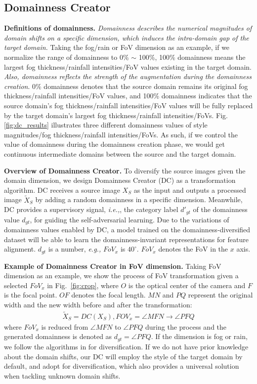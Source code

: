 \documentclass[10pt,journal,compsoc]{IEEEtran}
\begin{document}
\subsection{Domainness Creator}
\label{sec:domainness creator}
\textbf{Definitions of domainness.} \textit{Domainness describes the numerical magnitudes of domain shifts on a specific dimension, which induces the intra-domain gap of the target domain.} 
Taking the fog/rain or FoV dimension as an example,  if we normalize the range of domainness to 0\% $\sim$ 100\%, 100\% domainness means the largest fog thickness/rainfall intensities/FoV values existing in the target domain. \textit{Also, domainness reflects the strength of the augmentation during the domainness creation}. 0\% domainness denotes that the source domain remains its original fog thickness/rainfall intensities/FoV values, and 100\% domainness indicates that the source domain's fog thickness/rainfall intensities/FoV values will be fully replaced by the target domain's largest fog thickness/rainfall intensities/FoVs. Fig. \ref{fig:dc_results} illustrates three different domainness values of style magnitudes/fog thickness/rainfall intensities/FoVs.
As such, if we control the value of domainness during the domainness creation phase, we would get continuous intermediate domains between the source and the target domain. 

\noindent \textbf{Overview of Domainness Creator.} To diversify the source images given the domain dimension,
we design Domainness Creator (DC) as a transformation algorithm. 
DC receives a source image $X_S$ as the input and outputs a processed image $\tilde{X}_{S}$ by adding a random domainness in a specific dimension.
Meanwhile, DC provides a  supervisory signal, \emph{i.e.,}, the category label $d'_{gt}$ of the domainness value $d_{gt}$,  for guiding the self-adversarial learning.  Due to the  variations of domainness values enabled by DC, a model trained on the  domainness-diversified dataset will be able to learn the domainness-invariant representations for feature alignment. $d_{gt}$ is a number, \emph{e.g.,} $FoV_x$ is $40^{\circ}$. $FoV_x$ denotes the FoV in the $x$ axis.

\noindent \textbf{Example of Domainness Creator in FoV dimension.} Taking FoV dimension as an example, we show the process of FoV transformation given a selected $FoV_{x}$ in Fig.~\ref{fig:crop}, where $O$ is the optical center of the camera and $F$ is the focal point. $OF$ denotes the focal length. $MN$ and $PQ$ represent the original width and the new width before and after the transformation: 
\begin{align}
\tilde{X}_{S} = DC(X_S), FOV_x = \angle MFN \rightarrow \angle PFQ
\end{align}
where $FoV_{x}$ is  reduced from $\angle MFN$ to $\angle PFQ$ during the process and the generated domainness is denoted as $d_{gt}=\angle PFQ$. 
If the dimension is fog or rain, we follow the algorithms in \cite{FoggyCity,rainy_city} for diversification. If we do not have prior knowledge about the domain shifts, our DC will employ the style of the target domain by default, and adopt \cite{FDA} for diversification, which also provides a universal solution when tackling unknown domain shifts. 
\end{document}
